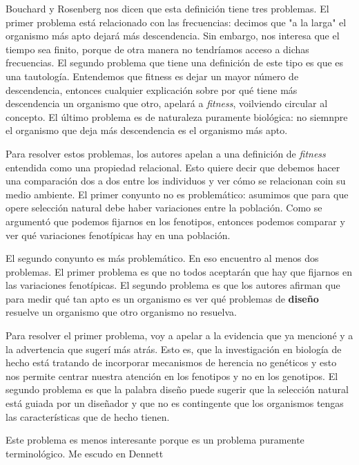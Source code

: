 Bouchard y Rosenberg \cite{Bouchard2004} nos dicen que esta definición tiene tres problemas. El primer problema está relacionado con las frecuencias: decimos que "a la larga" el organismo más apto dejará más descendencia. Sin embargo, nos interesa que el tiempo sea finito, porque de otra manera no tendríamos acceso a dichas frecuencias. El segundo problema que tiene una definición de este tipo es que es una tautología. Entendemos que fitness es dejar un mayor número de descendencia, entonces cualquier explicación sobre por qué tiene más descendencia un organismo que otro, apelará a \emph{fitness}, voilviendo circular al concepto. El último problema es de naturaleza puramente biológica: no siemnpre el organismo que deja más descendencia es el organismo más apto.

Para resolver estos problemas, los autores apelan a una definición de \emph{fitness} entendida como una propiedad relacional. Esto quiere decir que debemos hacer una comparación dos a dos entre los individuos y ver cómo se relacionan coin su medio ambiente. El primer conyunto no es problemático: asumimos que para que opere selección natural debe haber variaciones entre la población. Como se argumentó que podemos fijarnos en los fenotipos, entonces podemos comparar y ver qué variaciones fenotípicas hay en una población.

El segundo conyunto es más problemático. En eso encuentro al menos dos problemas. El primer problema es que no todos aceptarán que hay que fijarnos en las variaciones fenotípicas. El segundo problema es que los autores afirman que para medir qué tan apto es un organismo es ver qué problemas de \textbf{diseño} resuelve un organismo que otro organismo no resuelva.

Para resolver el primer problema, voy a apelar a la evidencia que ya mencioné y a la advertencia que sugerí más atrás. Esto es, que la investigación en biología de hecho está tratando de incorporar mecanismos de herencia no genéticos y esto nos permite centrar nuestra atención en los fenotipos y no en los genotipos. El segundo problema es que la palabra diseño puede sugerir que la selección natural está guiada por un diseñador y que no es contingente que los organismos tengas las características que de hecho tienen.

Este problema es menos interesante porque es un problema puramente terminológico. Me escudo en Dennett

